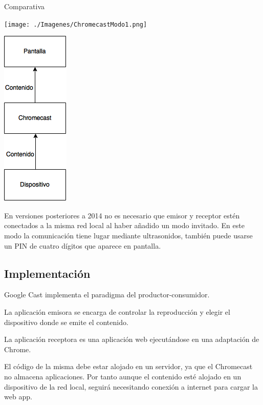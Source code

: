 \begin{frame}{Comparativa}
	\begin{minipage}[b]{.45\textwidth}
		\centering
		\texttt{[image: ./Imagenes/ChromecastModo1.png]}
	\end{minipage}\qquad
	\hspace{1.65cm}
	\begin{minipage}[b]{.3\textwidth}
		\centering
		\includegraphics[scale=0.52]{./Imagenes/ChromecastModo2.png}
	\end{minipage}
\end{frame}


\begin{frame}{ }
	En versiones posteriores a 2014 no es necesario que emisor y receptor estén conectados a la misma red local al haber añadido un modo invitado.
	En este modo la comunicación tiene lugar mediante ultrasonidos, también puede usarse un PIN de cuatro dígitos que aparece en pantalla. 
\end{frame}



\subsection{Implementación}
\begin{frame}
	Google Cast implementa el paradigma del productor-consumidor.
	\begin{block}{ }
		La aplicación emisora se encarga de controlar la reproducción y elegir el dispositivo donde se emite el contenido. 
	\end{block}
	
	\begin{block}{ }
		La aplicación receptora es una aplicación web ejecutándose en una adaptación de Chrome.
		
		El código de la misma debe estar alojado en un servidor, ya que el Chromecast no almacena aplicaciones. Por tanto aunque el contenido esté alojado en un dispositivo de la red local, seguirá necesitando conexión a internet para cargar la web app. 
	\end{block}
\end{frame}



